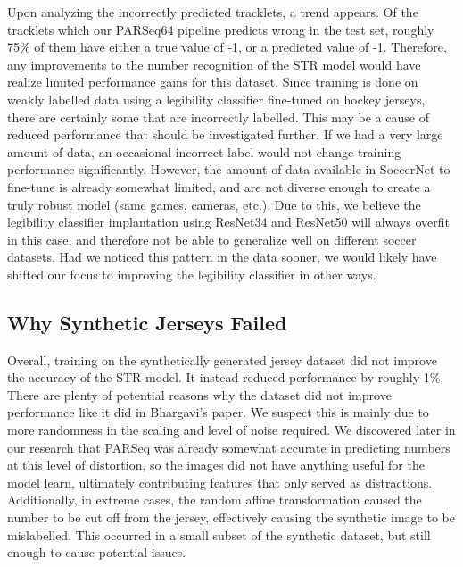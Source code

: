 \documentclass[11pt, letterpaper]{article}
\begin{document}
Upon analyzing the incorrectly predicted tracklets, a trend appears. Of the tracklets which our PARSeq64 pipeline predicts wrong in the test set, roughly 75\% of them have either a true value of -1, or a predicted value of -1. Therefore, any improvements to the number recognition of the STR model would have realize limited performance gains for this dataset. Since training is done on weakly labelled data using a legibility classifier fine-tuned on hockey jerseys, there are certainly some that are incorrectly labelled. This may be a cause of reduced performance that should be investigated further. If we had a very large amount of data, an occasional incorrect label would not change training performance significantly. However, the amount of data available in SoccerNet to fine-tune is already somewhat limited, and are not diverse enough to create a truly robust model (same games, cameras, etc.). Due to this, we believe the legibility classifier implantation using ResNet34 and ResNet50 will always overfit in this case, and therefore not be able to generalize well on different soccer datasets. Had we noticed this pattern in the data sooner, we would likely have shifted our focus to improving the legibility classifier in other ways.

\subsection{Why Synthetic Jerseys Failed}

Overall, training on the synthetically generated jersey dataset did not improve the accuracy of the STR model. It instead reduced performance by roughly 1\%. There are plenty of potential reasons why the dataset did not improve performance like it did in Bhargavi's paper. We suspect this is mainly due to more randomness in the scaling and level of noise required. We discovered later in our research that PARSeq was already somewhat accurate in predicting numbers at this level of distortion, so the images did not have anything useful for the model learn, ultimately contributing features that only served as distractions. Additionally, in extreme cases, the random affine transformation caused the number to be cut off from the jersey, effectively causing the synthetic image to be mislabelled. This occurred in a small subset of the synthetic dataset, but still enough to cause potential issues.
\end{document}
